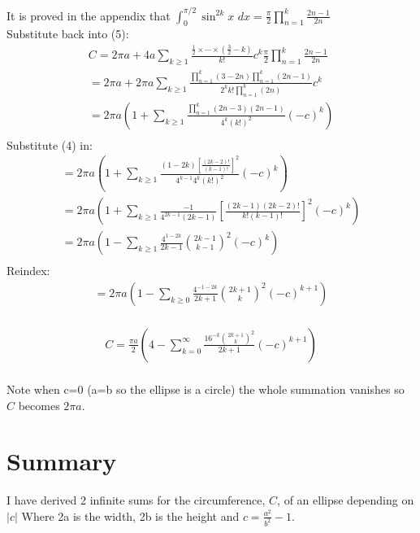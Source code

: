 \documentclass{article}
\begin{document}
It is proved in the appendix that 
$\int_{0}^{\pi/2}\sin^{2k}x\,\,dx = \frac{\pi}{2}\prod_{n=1}^k\frac{2n-1}{2n}$\\
Substitute back into (5):
\begin{equation*}
\begin{split}
	C
	= 2\pi a+4a\sum_{k\geq 1}\frac{\frac{1}{2}\times\cdots\times(\frac{3}{2}-k)}{k!}c^k\frac{\pi}{2}\prod_{n=1}^k\frac{2n-1}{2n}\\
	= 2\pi a + 2\pi a\sum_{k\geq 1}\frac{\prod_{n=1}^k(3-2n)\prod_{n=1}^k(2n-1)}{2^kk!\prod_{n=1}^k(2n)}c^k\\
	= 2\pi a\left(1+\sum_{k\geq 1}\frac{\prod_{n=1}^k(2n-3)(2n-1)}{4^k(k!)^2}(-c)^k\right)\\
\end{split}
\end{equation*}
Substitute (4) in:
\begin{equation*}
\begin{split}
	= 2\pi a\left(1+\sum_{k\geq 1}\frac{(1-2k)\left[\frac{(2k-2)!}{(k-1)!}\right]^2}{4^{k-1}4^k(k!)^2}(-c)^k\right)\\
	= 2\pi a\left(1+\sum_{k\geq 1}\frac{-1}{4^{2k-1}(2k-1)}\left[\frac{(2k-1)(2k-2)!}{k!(k-1)!}\right]^2(-c)^k\right)\\
	= 2\pi a\left(1-\sum_{k\geq 1}\frac{4^{1-2k}}{2k-1}{{2k-1}\choose {k-1}}^2(-c)^k\right)\\
\end{split}
\end{equation*}
Reindex:
\begin{equation*}
\begin{split}
	= 2\pi a\left(1-\sum_{k\geq 0}\frac{4^{-1-2k}}{2k+1}{{2k+1}\choose k}^2(-c)^{k+1}\right)\\
\end{split}
\end{equation*}
\begin{tcolorbox}
\begin{equation*}
\begin{split}
	C = \frac{\pi a}{2}\left(4-\sum_{k=0}^{\infty}\frac{16^{-k}{{2k+1}\choose k}^2}{2k+1}(-c)^{k+1}\right)\\
\end{split}
\end{equation*}
\end{tcolorbox}
Note when c=0 (a=b so the ellipse is a circle) the whole summation vanishes so $C$ becomes $2\pi a$.



\section{Summary}
I have derived 2 infinite sums for the circumference, $C$, of an ellipse depending on $|c|$ Where 2a is the width, 2b is the height and $c=\frac{a^2}{b^2}-1$.
\begin{equation*}
\end{equation*}
\end{document}
